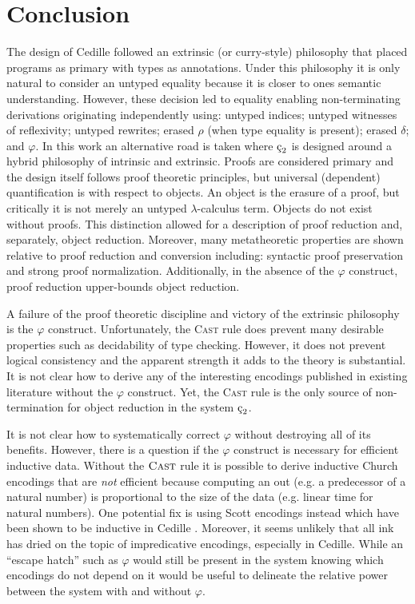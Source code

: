 \chapter{Conclusion}

The design of Cedille followed an extrinsic (or curry-style) philosophy that placed programs as primary with types as annotations.
Under this philosophy it is only natural to consider an untyped equality because it is closer to ones semantic understanding.
However, these decision led to equality enabling non-terminating derivations originating independently using: untyped indices; untyped witnesses of reflexivity; untyped rewrites; erased $\rho$ (when type equality is present); erased $\delta$; and $\varphi$.
In this work an alternative road is taken where $\ced$ is designed around a hybrid philosophy of intrinsic and extrinsic.
Proofs are considered primary and the design itself follows proof theoretic principles, but universal (dependent) quantification is with respect to objects.
An object is the erasure of a proof, but critically it is not merely an untyped $\lambda$-calculus term.
Objects do not exist without proofs.
This distinction allowed for a description of proof reduction and, separately, object reduction.
Moreover, many metatheoretic properties are shown relative to proof reduction and conversion including: syntactic proof preservation and strong proof normalization.
Additionally, in the absence of the $\varphi$ construct, proof reduction upper-bounds object reduction.

A failure of the proof theoretic discipline and victory of the extrinsic philosophy is the $\varphi$ construct.
Unfortunately, the \textsc{Cast} rule does prevent many desirable properties such as decidability of type checking.
However, it does not prevent logical consistency and the apparent strength it adds to the theory is substantial.
It is not clear how to derive any of the interesting encodings published in existing literature without the $\varphi$ construct.
Yet, the \textsc{Cast} rule is the only source of non-termination for object reduction in the system $\ced$.

It is not clear how to systematically correct $\varphi$ without destroying all of its benefits.
However, there is a question if the $\varphi$ construct is necessary for efficient inductive data.
Without the $\textsc{Cast}$ rule it is possible to derive inductive Church encodings that are \textit{not} efficient because computing an out (e.g. a predecessor of a natural number) is proportional to the size of the data (e.g. linear time for natural numbers).
One potential fix is using Scott encodings instead which have been shown to be inductive in Cedille \cite{jenkins2021monotone}.
Moreover, it seems unlikely that all ink has dried on the topic of impredicative encodings, especially in Cedille.
While an ``escape hatch'' such as $\varphi$ would still be present in the system knowing which encodings do not depend on it would be useful to delineate the relative power between the system with and without $\varphi$.


